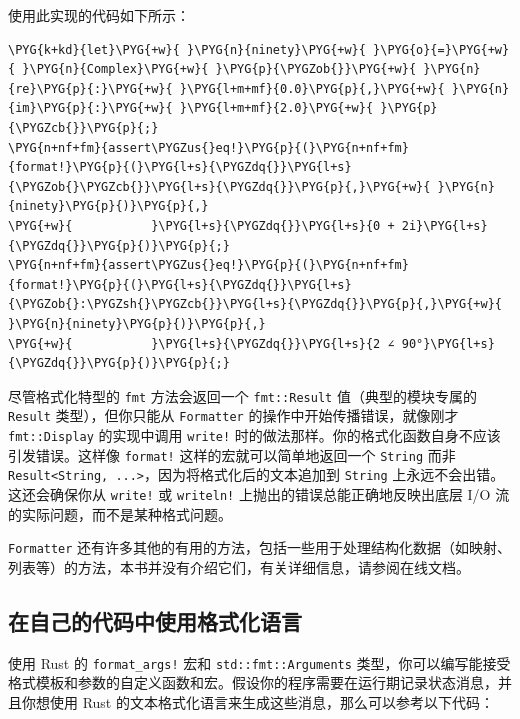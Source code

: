使用此实现的代码如下所示：

\begin{Verbatim}[commandchars=\\\{\},breaklines=true,breakanywhere=true,fontsize=\codefont,xleftmargin=17bp]
\PYG{k+kd}{let}\PYG{+w}{ }\PYG{n}{ninety}\PYG{+w}{ }\PYG{o}{=}\PYG{+w}{ }\PYG{n}{Complex}\PYG{+w}{ }\PYG{p}{\PYGZob{}}\PYG{+w}{ }\PYG{n}{re}\PYG{p}{:}\PYG{+w}{ }\PYG{l+m+mf}{0.0}\PYG{p}{,}\PYG{+w}{ }\PYG{n}{im}\PYG{p}{:}\PYG{+w}{ }\PYG{l+m+mf}{2.0}\PYG{+w}{ }\PYG{p}{\PYGZcb{}}\PYG{p}{;}
\PYG{n+nf+fm}{assert\PYGZus{}eq!}\PYG{p}{(}\PYG{n+nf+fm}{format!}\PYG{p}{(}\PYG{l+s}{\PYGZdq{}}\PYG{l+s}{\PYGZob{}\PYGZcb{}}\PYG{l+s}{\PYGZdq{}}\PYG{p}{,}\PYG{+w}{ }\PYG{n}{ninety}\PYG{p}{)}\PYG{p}{,}
\PYG{+w}{           }\PYG{l+s}{\PYGZdq{}}\PYG{l+s}{0 + 2i}\PYG{l+s}{\PYGZdq{}}\PYG{p}{)}\PYG{p}{;}
\PYG{n+nf+fm}{assert\PYGZus{}eq!}\PYG{p}{(}\PYG{n+nf+fm}{format!}\PYG{p}{(}\PYG{l+s}{\PYGZdq{}}\PYG{l+s}{\PYGZob{}:\PYGZsh{}\PYGZcb{}}\PYG{l+s}{\PYGZdq{}}\PYG{p}{,}\PYG{+w}{ }\PYG{n}{ninety}\PYG{p}{)}\PYG{p}{,}
\PYG{+w}{           }\PYG{l+s}{\PYGZdq{}}\PYG{l+s}{2 ∠ 90°}\PYG{l+s}{\PYGZdq{}}\PYG{p}{)}\PYG{p}{;}
\end{Verbatim}

尽管格式化特型的 \texttt{fmt} 方法会返回一个 \texttt{fmt::Result} 值（典型的模块专属的 \texttt{Result} 类型），但你只能从 \texttt{Formatter} 的操作中开始传播错误，就像刚才 \texttt{fmt::Display} 的实现中调用 \texttt{write!} 时的做法那样。你的格式化函数自身不应该引发错误。这样像 \texttt{format!} 这样的宏就可以简单地返回一个 \texttt{String} 而非 \texttt{Result<String, ...>}，因为将格式化后的文本追加到 \texttt{String} 上永远不会出错。这还会确保你从 \texttt{write!} 或 \texttt{writeln!} 上抛出的错误总能正确地反映出底层 I/O 流的实际问题，而不是某种格式问题。

\texttt{Formatter} 还有许多其他的有用的方法，包括一些用于处理结构化数据（如映射、列表等）的方法，本书并没有介绍它们，有关详细信息，请参阅在线文档。

\subsection{在自己的代码中使用格式化语言}

使用 Rust 的 \texttt{format\_args!} 宏和 \texttt{std::fmt::Arguments} 类型，你可以编写能接受格式模板和参数的自定义函数和宏。假设你的程序需要在运行期记录状态消息，并且你想使用 Rust 的文本格式化语言来生成这些消息，那么可以参考以下代码：

